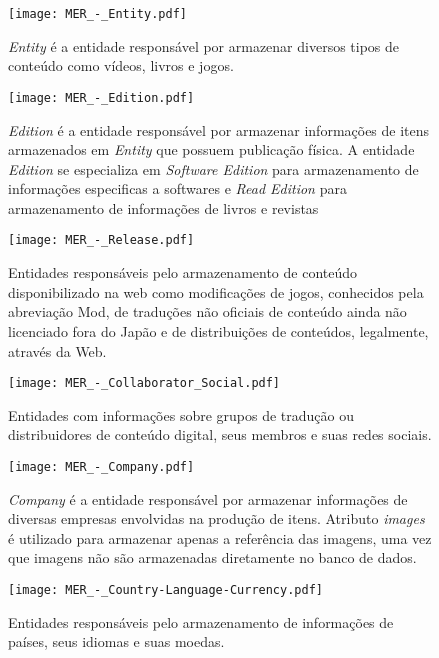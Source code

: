 \documentclass[12pt]{article}
\begin{document}
\begin{figure}[H]
\centering
\texttt{[image: MER\_-\_Entity.pdf]}
\caption{\textit{Entity} é a entidade responsável por armazenar diversos tipos de conteúdo como vídeos, livros e jogos.} \label{entity}
\end{figure}

\begin{figure}[H]
\centering
\texttt{[image: MER\_-\_Edition.pdf]}
\caption{\textit{Edition} é a entidade responsável por armazenar informações de itens armazenados em \textit{Entity} que possuem publicação física. A entidade \textit{Edition} se especializa em \textit{Software Edition} para armazenamento de informações especificas a softwares e \textit{Read Edition} para armazenamento de informações de livros e revistas}\label{edition}
\end{figure}

\begin{figure}[H]
\centering
\texttt{[image: MER\_-\_Release.pdf]}
\caption{Entidades responsáveis pelo armazenamento de conteúdo disponibilizado na web como modificações de jogos, conhecidos pela abreviação Mod, de traduções não oficiais de conteúdo ainda não licenciado fora do Japão e de distribuições de conteúdos, legalmente, através da Web.} \label{Release}
\end{figure}

\begin{figure}[H]
\centering
\texttt{[image: MER\_-\_Collaborator\_Social.pdf]}
\caption{Entidades com informações sobre grupos de tradução ou distribuidores de conteúdo digital, seus membros e suas redes sociais.} \label{collaborator}
\end{figure}


\begin{figure}[H]
\centering
\texttt{[image: MER\_-\_Company.pdf]}
\caption{\textit{Company} é a entidade responsável por armazenar informações de diversas empresas envolvidas na produção de itens. Atributo \textit{images} é utilizado para armazenar apenas a referência das imagens, uma vez que imagens não são armazenadas diretamente no banco de dados.}\label{company}
\end{figure}

\begin{figure}[H]
\centering
\texttt{[image: MER\_-\_Country-Language-Currency.pdf]}
\caption{Entidades responsáveis pelo armazenamento de informações de países, seus idiomas e suas moedas.} \label{hash}
\end{figure}
\end{document}
